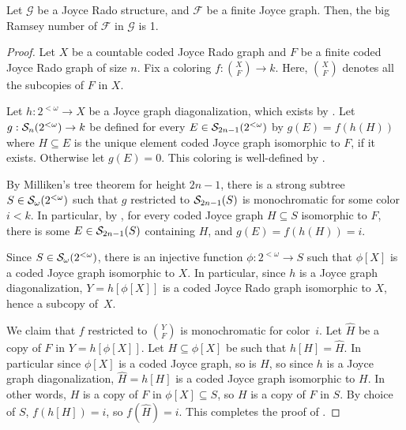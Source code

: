 \begin{theorem}[$\ACA_0$]\label{thm:strong-rado-one-type}
  Let $\mathcal{G}$ be a Joyce Rado structure, and $\mathcal{F}$ be a finite Joyce graph. Then, the big Ramsey number of $\mathcal{F}$ in $\mathcal{G}$ is 1.
\end{theorem}
\begin{proof}
Let $X$ be a countable coded Joyce Rado graph and $F$ be a finite coded Joyce Rado graph of size $n$. Fix a coloring $f: {X \choose F} \to k$. Here, ${X \choose F}$ denotes all the subcopies of $F$ in $X$.

Let $h: 2^{<\omega} \to X$ be a Joyce graph diagonalization, which exists by . Let $g: \mathcal{S}_{n}({2^{<\omega}}) \to k$ be defined for every $E \in \mathcal{S}_{2n-1}({2^{<\omega}})$ by $g(E) = f(h(H))$ where $H \subseteq E$ is the unique element coded Joyce graph isomorphic to $F$, if it exists. Otherwise let $g(E) = 0$. This coloring is well-defined by .


By Milliken's tree theorem for height $2n-1$, there is a strong subtree $S \in \mathcal{S}_{\omega}({2^{<\omega}})$ such that $g$ restricted to $\mathcal{S}_{2n-1}({S})$ is monochromatic for some color $i < k$. In particular, by , for every coded Joyce graph $H \subseteq S$ isomorphic to $F$, there is some $E \in \mathcal{S}_{2n-1}({S})$ containing $H$, and $g(E) = f(h(H)) = i$.

Since $S \in \mathcal{S}_{\omega}({2^{<\omega}})$, there is an injective function $\phi: 2^{<\omega} \to S$ such that $\phi[X]$ is a coded Joyce graph isomorphic to $X$. In particular, since $h$ is a Joyce graph diagonalization, $Y = h[\phi[X]]$ is a coded Joyce Rado graph isomorphic to $X$, hence a subcopy of~$X$.

We claim that $f$ restricted to ${Y \choose F}$ is monochromatic for color~$i$.
Let $\hat{H}$ be a copy of $F$ in $Y = h[\phi[X]]$. Let $H \subseteq \phi[X]$ be such that $h[H] = \hat{H}$. In particular since $\phi[X]$ is a coded Joyce graph, so is $H$, so since $h$ is a Joyce graph diagonalization, $\hat{H} = h[H]$ is a coded Joyce graph isomorphic to $H$. In other words, $H$ is a copy of $F$ in $\phi[X] \subseteq S$, so $H$ is a copy of $F$ in $S$. By choice of $S$, $f(h[H]) = i$, so $f(\hat{H}) = i$. This completes the proof of .
\end{proof}

